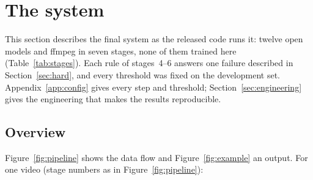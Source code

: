 \section{The system}\label{sec:system}

This section describes the final system as the released code runs it: twelve open models and ffmpeg in seven stages,
none of them trained here (Table~\ref{tab:stages}). Each rule of stages~4--6 answers one failure described in
Section~\ref{sec:hard}, and every threshold was fixed on the development set. Appendix~\ref{app:config} gives every step
and threshold; Section~\ref{sec:engineering} gives the engineering that makes the results reproducible.

\subsection{Overview}
Figure~\ref{fig:pipeline} shows the data flow and Figure~\ref{fig:example} an output. For one video (stage numbers as in Figure~\ref{fig:pipeline}):
